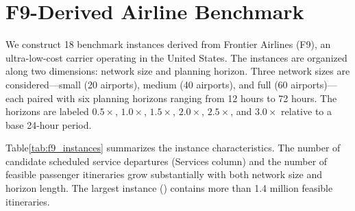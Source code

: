 \section{F9-Derived Airline Benchmark}
\label{sec:f9_benchmark}

We construct 18 benchmark instances derived from Frontier Airlines (F9), an ultra-low-cost carrier operating in the United States. The instances are organized along two dimensions: network size and planning horizon. Three network sizes are considered---small (20 airports), medium (40 airports), and full (60 airports)---each paired with six planning horizons ranging from 12 hours to 72 hours. The horizons are labeled $0.5\times$, $1.0\times$, $1.5\times$, $2.0\times$, $2.5\times$, and $3.0\times$ relative to a base 24-hour period.

Table\ref{tab:f9_instances} summarizes the instance characteristics. The number of candidate scheduled service departures (Services column) and the number of feasible passenger itineraries grow substantially with both network size and horizon length. The largest instance () contains more than 1.4 million feasible itineraries.

